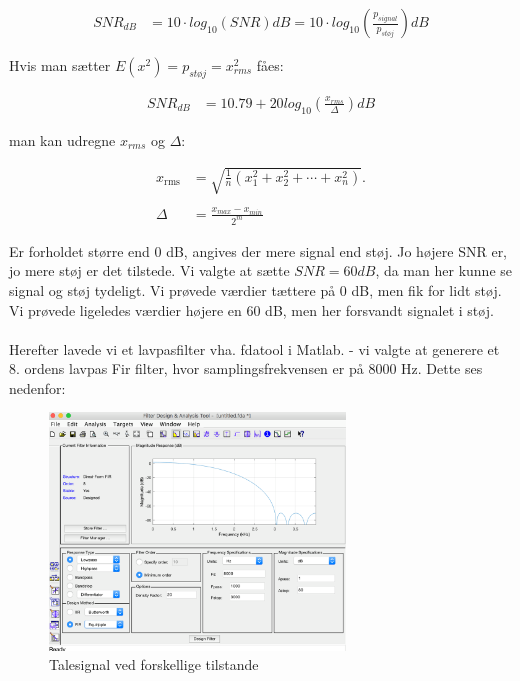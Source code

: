 \documentclass[a4paper]{report}
\begin{document}
\begin{align}
SNR_{dB} &= 10 \cdot log_{10}(SNR) dB = 10 \cdot log_{10}(\frac{p_{signal}}{p_{støj}})dB
\end{align}

Hvis man sætter $E(x^2)=p_{støj}= x^2_{rms}$ fåes: 

\begin{align}
SNR_{dB} &= 10.79 + 20log_{10}(\frac{x_{rms}}{\Delta}) dB
\end{align}

man kan udregne $x_{rms}$ og $\Delta:$

\begin{align}
x_{\mathrm{rms}} &= {\sqrt {{\frac {1}{n}}\left(x_{1}^{2}+x_{2}^{2}+\cdots +x_{n}^{2}\right)}}.\\
\\
\Delta &= \frac{x_{max}-x_{min}}{2^m}
\end{align}


Er forholdet større end 0 dB, angives der mere signal end støj. Jo højere SNR er, jo mere støj er det tilstede. Vi valgte at sætte $SNR=60 dB$, da man her kunne se signal og støj tydeligt. Vi prøvede værdier tættere på 0 dB, men fik for lidt støj. Vi prøvede ligeledes værdier højere en 60 dB, men her forsvandt signalet i støj.\\
\\  

Herefter lavede vi et lavpasfilter vha. fdatool i Matlab. - vi valgte at generere et 8. ordens lavpas Fir filter, hvor samplingsfrekvensen er på 8000 Hz. Dette ses nedenfor:  

\begin{figure}[H] 
\centering
\includegraphics[width=0.7\textwidth]{grafer/lavpasfilter}
\caption{Talesignal ved forskellige tilstande} \label{lavpasfilter}
\end{figure}
\end{document}
